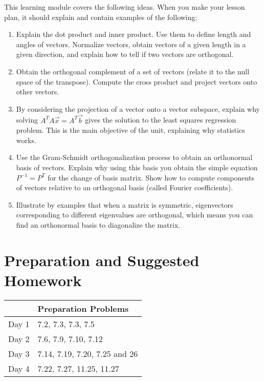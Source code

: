 \documentclass[10pt]{article}
\theoremstyle{plain}
\theoremstyle{box}
\newcommand{\mytitle}{Inner Products}
\begin{document}
\noindent{\huge{\bf \mytitle}}

\noindent
This learning module covers the following ideas.  When you make your lesson plan, it should explain and contain examples of the following:
\begin{enumerate}

\item Explain the dot product and inner product. Use them to define length and angles of vectors. Normalize vectors, obtain vectors of a given length in a given direction, and explain how to tell if two vectors are orthogonal. 

\item Obtain the orthogonal complement of a set of vectors (relate it to the null space of the transpose). Compute the cross product and project vectors onto other vectors.

\item By considering the projection of a vector onto a vector subspace, explain why solving $A^TA \vec x = A^T\vec b$ gives the solution to the least squares regression problem. This is the main objective of the unit, explaining why statistics works.

\item Use the Gram-Schmidt orthogonalization process to obtain an orthonormal basis of vectors. Explain why using this basis you obtain the simple equation $P^{-1}=P^T$ for the change of basis matrix. Show how to compute components of vectors relative to an orthogonal basis (called Fourier coefficients).  

\item Illustrate by examples that when a matrix is symmetric, eigenvectors corresponding to different eigenvalues are orthogonal, which means you can find an orthonormal basis to diagonalize the matrix. 


\end{enumerate}


\section{Preparation and Suggested Homework}

\begin{center}
\begin{tabular}{ll}
&Preparation Problems\\
\hline\hline
Day 1& 7.2, 7.3, 7.3, 7.5\\
Day 2& 7.6, 7.9, 7.10, 7.12\\
Day 3& 7.14, 7.19, 7.20, 7.25 and 26\\
Day 4& 7.22, 7.27, 11.25, 11.27
\end{tabular}
\end{center}
\end{document}
